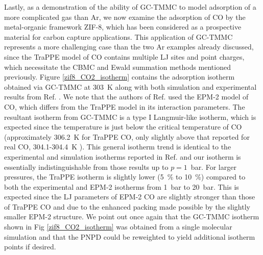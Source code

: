 Lastly, as a demonstration of the ability of GC-TMMC to model adsorption of a more complicated gas than Ar, we now examine the adsorption of CO by the metal-organic framework ZIF-8, which has been considered as a prospective material for carbon capture applications\cite{Wong-Ng_High_2011,Perez-Pellitero_Adsorption_2010}. This application of GC-TMMC represents a more challenging case than the two Ar examples already discussed, since the TraPPE model of CO contains multiple LJ sites and point charges, which necessitate the CBMC and Ewald summation methods mentioned previously. Figure \ref{zif8_CO2_isotherm} contains the adsorption isotherm obtained via GC-TMMC at 303~K along with both simulation and experimental results from Ref. . We note that the authors of Ref.  used the EPM-2 model of CO\cite{Harris_Carbon_1995}, which differs from the TraPPE model in its interaction parameters. The resultant isotherm from GC-TMMC is a type I Langmuir-like isotherm\cite{Sing_Reporting_1985}, which is expected since the temperature is just below the critical temperature of CO (approximately 306.2~K for TraPPE CO\cite{Potoff_Vapor_2001}, only slightly above that reported for real CO, 304.1-304.4~K ). This general isotherm trend is identical to the experimental and simulation isotherms reported in Ref.  and our isotherm is essentially indistinguishable from those results up to $p = 1$~bar. For larger pressures, the TraPPE isotherm is slightly lower (5~\% to 10~\%) compared to both the experimental and EPM-2 isotherms from 1~bar to 20~bar. This is expected since the LJ parameters of EPM-2 CO are slightly stronger than those of TraPPE CO and due to the enhanced packing made possible by the slightly smaller EPM-2 structure. We point out once again that the GC-TMMC isotherm shown in Fig \ref{zif8_CO2_isotherm} was obtained from a single molecular simulation and that the PNPD could be reweighted to yield additional isotherm points if desired.

